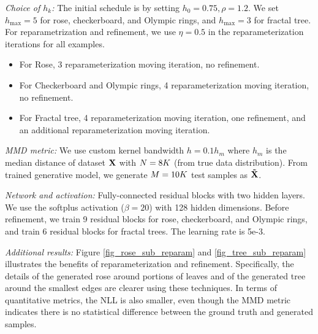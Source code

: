\documentclass{article}
\theoremstyle{remark}
\theoremstyle{plain}
\newcommand{\revold}[1]{{\color{black}#1}}
\begin{document}
{\noindent
\textit{Choice of $h_k$:} The initial schedule is by setting $h_0=0.75, \rho=1.2$. We set $h_{\max}=5$ for rose, checkerboard, and Olympic rings, and $h_{\max}=3$ for fractal tree. For reparametrization and refinement, we use $\eta=0.5$ in the reparameterization iterations for all examples.
\begin{itemize}
    \item For Rose, 3 reparameterization moving iteration, no refinement. 
    \item For Checkerboard and Olympic rings, 4 reparameterization moving iteration, no refinement. 
    \item For Fractal tree, 4 reparameterization moving iteration, one refinement, and an additional reparameterization moving iteration.
\end{itemize}
\noindent
\textit{MMD metric:} We use custom kernel bandwidth $h = 0.1 h_m$ where $h_m$ is the median distance of dataset $\bf{X}$ with $N=\revold{8K}$ (from true data distribution).
From trained generative model, we generate $M=\revold{10K}$ test samples as $\bf{\tilde{X}}$.


\vspace{5pt}
\noindent
\textit{Network and activation:} Fully-connected residual blocks with two hidden layers. We use the softplus activation ($\beta=20$) with 128 hidden dimensions. Before refinement, we train 9 residual blocks for rose, checkerboard, and Olympic rings, and train 6 residual blocks for fractal trees. The learning rate is 5e-3.

\vspace{5pt}
\noindent 
\textit{Additional results:} Figure \ref{fig_rose_sub_reparam} and \ref{fig_tree_sub_reparam} illustrates the benefits of reparameterization and refinement. Specifically, the details of the generated rose around portions of leaves and of the generated tree around the smallest edges are clearer using these techniques. In terms of quantitative metrics, the NLL is also smaller, even though the MMD metric indicates there is no statistical difference between the ground truth and generated samples. 



}
\end{document}
